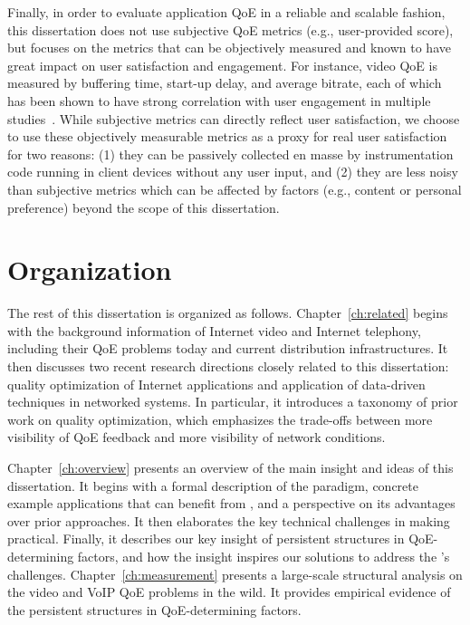 %
Finally, in order to evaluate application QoE in a reliable 
and scalable fashion, this dissertation does not use subjective QoE 
metrics (e.g., user-provided score), but focuses on the metrics that can be
objectively measured and known to have great impact on user satisfaction 
and engagement.
For instance, video QoE is measured by buffering time, start-up delay,
and average bitrate, each of which has been shown to have strong
correlation with user engagement in multiple 
studies~\cite{sigcomm11,akamai-imc12}.
While subjective metrics can directly reflect user satisfaction, we
choose to use these objectively measurable 
metrics as a proxy for real user satisfaction for two reasons:
(1) they can be passively collected en masse by instrumentation code 
running in client devices without any user input, and (2) they
are less noisy than subjective metrics which can be affected by factors
(e.g., content or personal preference) beyond the scope of this dissertation.




\section{Organization}
The rest of this dissertation is organized as follows.
Chapter~\ref{ch:related} begins with the background information of
Internet video and Internet telephony, including their QoE problems
today and current distribution infrastructures.
It then discusses two recent research directions closely 
related to this dissertation: 
quality optimization of Internet applications and application of data-driven 
techniques in networked systems.
In particular, it introduces a taxonomy of prior work on quality 
optimization, which emphasizes the trade-offs between 
more visibility of QoE feedback and more visibility of network
conditions.

Chapter~\ref{ch:overview} presents an overview of the main insight and 
ideas of this dissertation.
It begins with a formal description of the \ddn paradigm,
concrete example applications that can benefit from \ddn, and a
perspective on its advantages over prior approaches.
It then elaborates the key technical challenges in making \ddn practical. 
Finally, it describes our key insight of persistent structures in 
QoE-determining factors, and how the insight inspires our solutions to 
address the \ddn's challenges.
Chapter~\ref{ch:measurement} presents a large-scale structural analysis
on the video and VoIP QoE problems in the wild.
It provides empirical evidence of the persistent structures in QoE-determining
factors. 


